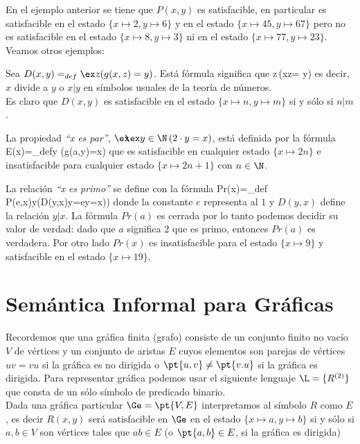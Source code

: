 \documentclass[11pt,letterpaper]{article}
\begin{document}
En el ejemplo anterior se tiene que $P(x,y)$ es satisfacible, en particular
es satisfacible en el estado $\{x\mapsto 2,y\mapsto 6\}$ y en el estado $\{x\mapsto 45,
y\mapsto 67\}$  pero no es satisfacible
en el estado $\{x\mapsto 8,y\mapsto 3\}$ ni en el estado $\{x\mapsto 77,y\mapsto 23\}$. \\


Veamos otros ejemplos:
\be
\item Sea $D(x,y)=_{def}\ex z(g(x,z)=y)$. Está fórmula significa que
\beqs
\exbb z\in\N\,(x\cdot z= y)
\eeqs 
es decir, $x$ divide a $y$ o $x|y$ en símbolos
usuales de la teoría de números.\\
Es claro que $D(x,y)$ es satisfacible en el estado $\{x\mapsto n,y\mapsto m\}$ si y sólo si $n|m$.
\item La propiedad \emph{``x es par''}, $\exbb y\in\N\,(2\cdot y=x)$, está definida por la fórmula 
\beqs
E(x)=_{def}\ex y (g(a,y)=x)
\eeqs 
que es satisfacible en cualquier estado $\{x\mapsto 2n\}$ e insatisfacible
para cualquier estado $\{x\mapsto 2n+1\}$ con $n\in\N$. 
\item La relación \emph{``x es primo''} se define con la fórmula
\beqs
Pr(x)=_{def} P(e,x)\land\fa y\big(D(y,x)\imp y=e\lor y=x)\big)
\eeqs
donde la constante $e$ representa al $1$ y $D(y,x)$ define la relación $y|x$. La fórmula $Pr(a)$ es
cerrada por lo tanto podemos decidir su valor de verdad: dado que $a$ significa $2$
que es primo, entonces $Pr(a)$ es verdadera. Por otro lado $Pr(x)$ es
insatisfacible para el estado $\{x\mapsto 9\}$ y satisfacible en el estado
$\{x\mapsto 19\}$.
\ee


\section{Semántica Informal para Gráficas}


Recordemos que una gráfica finita (grafo) consiste de un conjunto finito no vacío $V$ de vértices
y un conjunto de aristas $E$ cuyos elementos son parejas de
vértices $uv=vu$ si la gráfica es no dirigida o $\pt{u,v}\neq\pt{v.u}$
si la gráfica es dirigida. Para representar
gráfica podemos usar el siguiente lenguaje $\L=\{R^{(2)}\}$ que consta de un
sólo símbolo de predicado binario.\\
Dada una gráfica particular $\Ge=\pt{V,E}$ interpretamos al símbolo
$R$ como $E$, es decir $R(x,y)$ será satisfacible en $\Ge$  en el estado
$\{x\mapsto a,y\mapsto b\}$ si y sólo si  $a,b\in V$ son vértices tales que $ab\in E$ (o $\pt{a,b}\in E$,
si la gráfica es dirigida)\\
\end{document}
